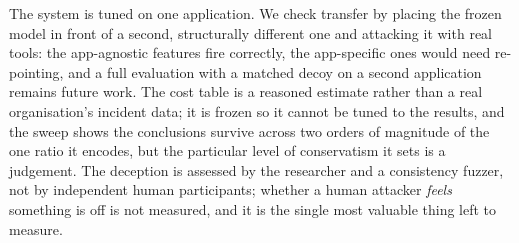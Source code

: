 The system is tuned on one application. We check transfer by placing the frozen
model in front of a second, structurally different one and attacking it with real
tools: the app-agnostic features fire correctly, the app-specific ones would need
re-pointing, and a full evaluation with a matched decoy on a second application
remains future work. The cost table is a reasoned estimate rather than a real
organisation's incident data; it is frozen so it cannot be tuned to the results,
and the sweep shows the conclusions survive across two orders of magnitude of the
one ratio it encodes, but the particular level of conservatism it sets is a
judgement. The deception is assessed by the researcher and a consistency fuzzer,
not by independent human participants; whether a human attacker \emph{feels} something
is off is not measured, and it is the single most valuable thing left to measure.
